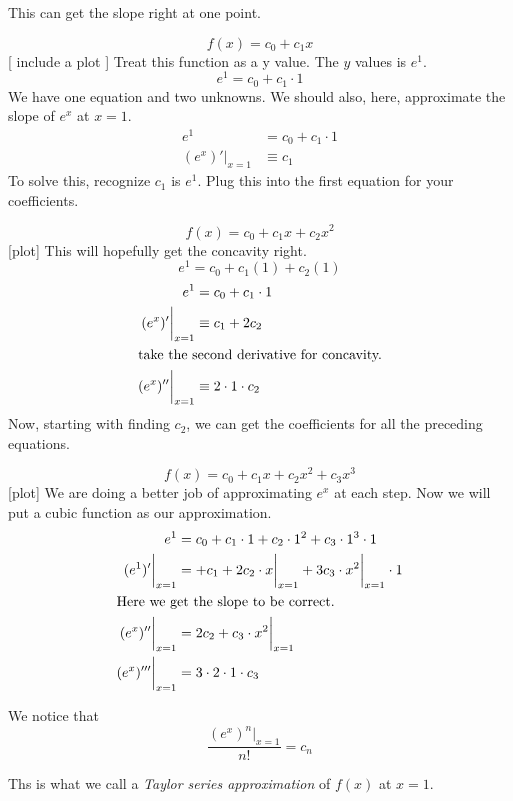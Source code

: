 \begin{ex}
  This can get the slope right at one point.

  \[ f(x)=c_0 + c_1x\]
  [ include a plot ]
  Treat this function as a y value. The $y$ values is $e^1$.
  \[e^1=c_0+c_1 \cdot 1\]
  We have one equation and two unknowns. We should also, here, approximate the
  slope of $e^x$ at $x=1$.
   \begin{align*}
    e^1&=c_0+c_1 \cdot 1 \\
    (e^x)' \bigg|_{x=1} &\equiv c_1
  \end{align*}
  To solve this, recognize $c_1$ is $e^1$. Plug this into the first equation for
  your coefficients.

  \[ f(x) = c_0 + c_1x + c_2x^2 \]
  [plot]
  This will hopefully get the concavity right.
  \[e^1= c_0+c_1(1)+c_2(1) \]
  \begin{align*}
    e^1&=c_0+c_1 \cdot 1 \\
    (e^x)' \bigg|_{x=1} &\equiv c_1 + 2 c_2 \\ \intertext{take the second
    derivative for concavity.}
    (e^x)'' \bigg|_{x=1} &\equiv 2 \cdot 1 \cdot c_2 \\
  \end{align*}
  Now, starting with finding $c_2$, we can get the coefficients for all the
  preceding equations.

  \[ f(x) = c_0 + c_1x + c_2x^2+c_3x^3 \]
  [plot]
  We are doing a better job of approximating $e^x$ at each step. Now we will put
  a cubic function as our approximation.
  \begin{align*}
    e^1&=c_0+c_1 \cdot 1+c_2 \cdot 1^2 + c_3 \cdot 1^3 \cdot 1 \\
    (e^1)' \bigg|_{x=1}&=+c_1 +2c_2 \cdot x \bigg|_{x=1}  +3 c_3 \cdot
    x^2\bigg|_{x=1} \cdot 1 \\ \intertext{Here we get the slope to be correct.}
    (e^x)'' \bigg|_{x=1} &= 2 c_2 + c_3 \cdot x^2 \bigg|_{x=1} \\
    (e^x)''' \bigg|_{x=1} &= 3 \cdot 2 \cdot 1 \cdot c_3
  \end{align*}

  We notice that \[\frac{ (e^x)^n \bigg|_{x=1}}{n!} = c_n \]

  Ths is what we call a \emph{Taylor series approximation} of $f(x)$ at $x=1$.
\end{ex}

